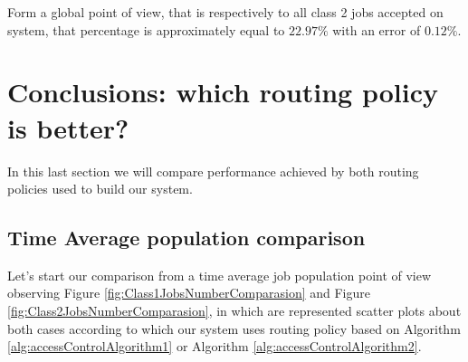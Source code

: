 \documentclass[10pt,a4paper]{article}
\begin{document}
Form a global point of view, that is respectively to all class 2 jobs accepted on system, that percentage is  approximately equal to $22.97\%$ with an error of $0.12\%$.

\begin{figure}[h!]
    \centering
\end{figure}


\newpage

\section{Conclusions: which routing policy is better?}

In this last section we will compare performance achieved by both routing policies used to build our system. 

\subsection{Time Average population comparison}
Let's start our comparison from a time average job population point of view observing Figure \ref{fig:Class1JobsNumberComparasion} and Figure \ref{fig:Class2JobsNumberComparasion}, in which are represented scatter plots about both cases according to which our system uses routing policy based on Algorithm \ref{alg:accessControlAlgorithm1} or Algorithm \ref{alg:accessControlAlgorithm2}.
\end{document}
